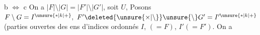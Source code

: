 b $\Longleftrightarrow$ c  On a $|F|\setminus|G|=|F'|\setminus|G'|$, soit $U$, Posons $F\setminus G=I^{\unsure{\ast|k|+}},\ F'\deleted{\unsure{\times|\setminus}}\unsure{\setminus}G'=I'^{\unsure{\ast|k|+}}$ (parties ouvertes des ens d'indices ordonnés $I$,  $(=F)$, $I'(=F')$. On a
